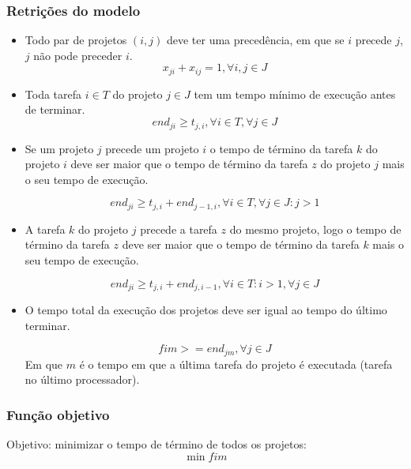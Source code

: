\documentclass[11pt,letterpaper]{article}
\begin{document}
\subsubsection*{Retrições do modelo}
\begin{itemize}
\item Todo par de projetos $(i,j)$ deve ter uma precedência, em que se $i$
  precede $j$, $j$ não pode preceder $i$. 
\begin{equation*}
  x_{ji}+x_{ij}=1, \forall i,j \in J
\end{equation*}

\item Toda tarefa $i \in T$ do projeto  $j \in J$ tem um tempo mínimo de execução antes de terminar. 
\begin{equation*}
  end_{ji} \geq t_{j,i}, \forall i \in T, \forall j \in J
\end{equation*}

\item Se um projeto $j$ precede um projeto $i$ o tempo de término da
  tarefa $k$ do projeto $i$ deve ser maior que o tempo de término da
  tarefa $z$ do projeto $j$ mais o seu tempo de execução.
 
\begin{equation*}
  end_{ji} \geq t_{j,i}+ end_{j-1,i}, \forall i \in T, \forall j \in J
  : j>1 
\end{equation*}

\item A tarefa $k$ do projeto $j$ precede a tarefa $z$ do mesmo
  projeto, logo o tempo de término da
  tarefa $z$ deve ser maior que o tempo de término da
  tarefa $k$ mais o seu tempo de execução.
 
\begin{equation*}
  end_{ji} \geq t_{j,i}+ end_{j,i-1}, \forall i \in T: i>1 , \forall j \in J
\end{equation*}

\item O tempo total da execução dos projetos deve ser igual ao tempo
  do último terminar.
 
\begin{equation*}
 fim>= end_{jm}, \forall j \in J
\end{equation*}
Em que $m$ é o tempo em que a última tarefa do projeto é executada
(tarefa no último processador).
\end{itemize}


\subsubsection*{Função objetivo}
Objetivo: minimizar o tempo de término de todos os projetos:
\begin{equation}
\min fim
\end{equation}
\end{document}
